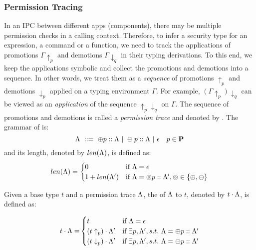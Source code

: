 {{{\subsubsection{\textbf{Permission Tracing}}\label{sec:trace_rules}
In an IPC between different apps (components), there may be multiple permission checks in a calling context.
Therefore, to infer a security type for an expression, a command or a function, we need to track
the applications of promotions $\Gamma\!\uparrow_{p}$ and demotions $\Gamma\!\downarrow_{q}$ in their typing derivations.
To this end,  we keep the applications symbolic and collect the promotions and demotions into a sequence.
In other words, we treat them as a \emph{sequence} of promotions $\uparrow_{p}$ and demotions $\downarrow_{p}$ applied on a typing environment $\Gamma$.
For example, $(\Gamma\!\uparrow_{p})\downarrow_{q}$ can be viewed as
an \emph{application} of the sequence $\uparrow_{p}\downarrow_{q}$ on $\Gamma$.
The sequence of promotions and demotions is called a \emph{permission trace} and denoted by {\trace}. The grammar of {\trace} is:
\begin{equation*}
\Lambda~::=~\oplus p ::\Lambda~|~ \ominus p :: \Lambda~|~ \epsilon
\quad p\in \mathbf{P}
\end{equation*}
and its length, denoted by $len(\Lambda)$, is defined as:
\begin{align*}
	len(\Lambda)=
	\begin{cases}
	    0 & \text{if}~ \Lambda=\epsilon\\
		1+len(\Lambda') & \text{if}~ \Lambda=\circledcirc p :: \Lambda', \circledcirc  \in\{\oplus , \ominus \}
	\end{cases}
\end{align*}

\begin{definition}\label{def:app-pt-t}
Given a base type $t$ and a permission trace $\Lambda$, the  of $\Lambda$ to $t$, denoted by $t\cdot\Lambda$,  is defined as:

\begin{equation*}
{t\cdot \ensuremath{\Lambda}=}
\begin{cases}
t & {\normalfont\text{if}}~\Lambda = \epsilon\\
(t\uparrow_{p})\cdot \Lambda' & {\normalfont\text{if}}~\exists p, \Lambda', s.t.~\Lambda = \oplus p :: \Lambda'\\
(t\downarrow_{p})\cdot \Lambda' & {\normalfont\text{if}}~\exists p, \Lambda', s.t.~\Lambda = \ominus p :: \Lambda'
\end{cases}
\end{equation*}
\end{definition}

}}}
